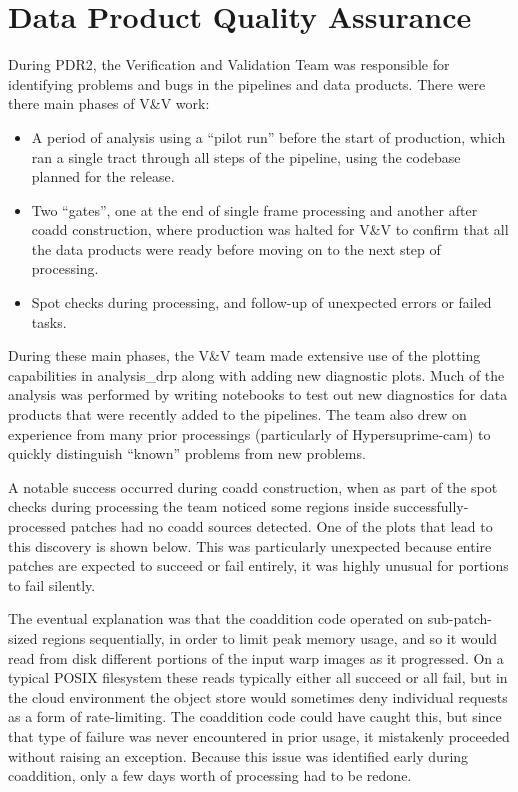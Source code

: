\section{Data Product Quality Assurance} \label{sec:qa}

During PDR2, the Verification and Validation Team was responsible for identifying problems and bugs
in the pipelines and data products. There were there main phases of V\&V work:

\begin{itemize}
\item A period of analysis using a “pilot run” before the start of production, which ran a single
tract through all steps of the pipeline, using the codebase planned for the release.
\item Two “gates”, one at the end of single frame processing and another after coadd construction,
where production was halted for V\&V to confirm that all the data products were ready before moving
on to the next step of processing.
\item Spot checks during processing, and follow-up of unexpected errors or failed tasks.
\end{itemize}

During these main phases, the V\&V team made extensive use of the plotting capabilities in
analysis\_drp along with adding new diagnostic plots. Much of the analysis was performed by writing
notebooks to test out new diagnostics for data products that were recently added to the pipelines.
The team also drew on experience from many prior processings (particularly of Hypersuprime-cam) to
quickly distinguish ``known'' problems from new problems.

A notable success occurred during coadd construction, when as part of the spot checks during
processing the team noticed some regions inside successfully-processed patches had no coadd sources
detected. One of the plots that lead to this discovery is shown below. This was particularly
unexpected because entire patches are expected to succeed or fail entirely, it was highly unusual
for portions to fail silently.

The eventual explanation was that the coaddition code operated on sub-patch-sized regions
sequentially, in order to limit peak memory usage, and so it would read from disk different portions
of the input warp images as it progressed. On a typical POSIX filesystem these reads typically
either all succeed or all fail, but in the cloud environment the object store would sometimes deny
individual requests as a form of rate-limiting. The coaddition code could have caught this, but
since that type of failure was never encountered in prior usage, it mistakenly proceeded without
raising an exception. Because this issue was identified early during coaddition, only a few days
worth of processing had to be redone.

